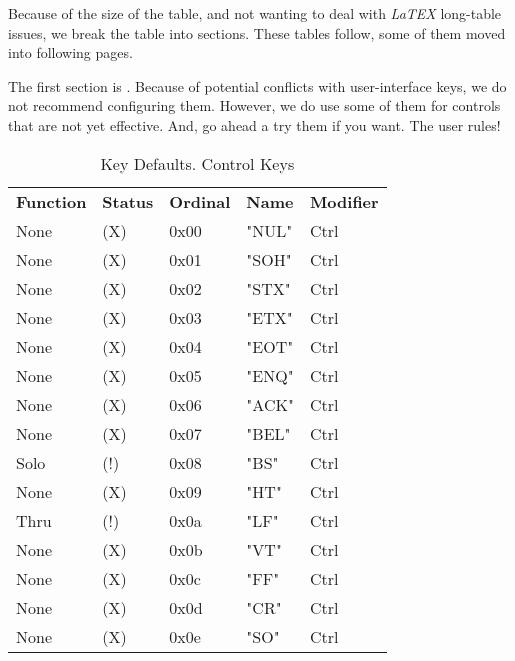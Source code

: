    Because of the size of the table, and not wanting to deal with \textsl{LaTEX}
   long-table issues, we break the table into sections.
   These tables follow, some of them moved into following pages.
   
   The first section is .
   Because of potential conflicts with user-interface keys, we do
   not recommend configuring them.  However, we do use some of them for controls
   that are not yet effective. And, go ahead a try them if you want.  The user
   rules!

   \begin{table}[htb!]
      \centering
      \caption{Key Defaults. Control Keys}
      \label{table:key_defaults_ctrl_keys}
      \begin{tabular}{l l l l l}
        \textbf{Function} & \textbf{Status} & \textbf{Ordinal} & \textbf{Name} & \textbf{Modifier} \\
        None               & (X)  &  0x00   & "NUL"        & Ctrl \\
        None               & (X)  &  0x01   & "SOH"        & Ctrl \\
        None               & (X)  &  0x02   & "STX"        & Ctrl \\
        None               & (X)  &  0x03   & "ETX"        & Ctrl \\
        None               & (X)  &  0x04   & "EOT"        & Ctrl \\
        None               & (X)  &  0x05   & "ENQ"        & Ctrl \\
        None               & (X)  &  0x06   & "ACK"        & Ctrl \\
        None               & (X)  &  0x07   & "BEL"        & Ctrl \\
        Solo               & (!)  &  0x08   & "BS"         & Ctrl \\
        None               & (X)  &  0x09   & "HT"         & Ctrl \\
        Thru               & (!)  &  0x0a   & "LF"         & Ctrl \\
        None               & (X)  &  0x0b   & "VT"         & Ctrl \\
        None               & (X)  &  0x0c   & "FF"         & Ctrl \\
        None               & (X)  &  0x0d   & "CR"         & Ctrl \\
        None               & (X)  &  0x0e   & "SO"         & Ctrl \\

\end{tabular}
\end{table}
